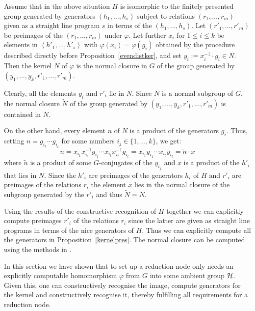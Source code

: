 \begin{Prop}
\label{kernelpres}
Assume that in the above situation $H$ is isomorphic to the
finitely presented group generated by generators $(h_1, \ldots, h_s)$
subject to relations $(r_1, \ldots, r_m)$ given as a straight line
program $s$ in terms of the $(h_1, \ldots, h_s)$. Let $(r'_1, \ldots,
r'_m)$ be preimages of the $(r_1, \ldots, r_m)$ under $\varphi$. 
Let further $x_i$ for $1 \le i \le k$ be elements in $\left< h'_1, \ldots, 
h'_s \right>$ with $\varphi(x_i) = \varphi(g_i)$ obtained by the procedure 
described directly before Proposition~\ref{evendistker}, and set 
$y_i := x_i^{-1} \cdot g_i \in N$. Then the kernel $N$ of
$\varphi$ is the normal closure in $G$ of the group generated by
$(y_1, \ldots, y_k, r'_1, \ldots, r'_m)$.
\end{Prop}
\proofbeg
Clearly, all the elements $y_i$ and $r'_i$ lie in $N$. Since $N$ is a
normal subgroup of $G$, the normal closure $\tilde N$ of the group generated
by $(y_1, \ldots, y_k, r'_1, \ldots, r'_m)$ is contained in $N$.

On the other hand, every element $n$ of $N$ is a product of the generators
$g_i$. Thus, setting $n = g_{i_1} \cdots g_{i_t}$ for some numbers
$i_j \in \{ 1, \ldots, k \}$, we get:
\[ n = x_{i_1} x_{i_1}^{-1} g_{i_1} \cdots x_{i_t} x_{i_t}^{-1} g_{i_t}
     = x_{i_1} y_{i_1} \cdots x_{i_t} y_{i_t}
     = \tilde n \cdot x \]
where $\tilde n$ is a product of some $G$-conjugates of the $y_{i_j}$
and $x$ is a product of the $h'_i$ that lies in $N$. Since the $h'_i$
are preimages of the generators $h_i$ of $H$ and $r'_i$ are preimages
of the relations $r_i$ the element $x$ lies in the normal closure
of the subgroup generated by the $r'_i$ and thus $\tilde N = N$.
\proofend

\begin{Rem}
Using the results of the constructive recognition of $H$ together we
can explicitly compute preimages $r'_i$ of the relations $r_i$ since
the latter are given as straight line programs in terms of the nice
generators of $H$. Thus we can explicitly compute all the generators in
Proposition~\ref{kernelpres}. The normal closure can be computed using
the methods in \cite[Chapter 2]{Ser}.
\end{Rem}

In this section we have shown that to set up a reduction node only needs
an explicitly computable homomorphism $\varphi$ from $G$ into some
ambient group $\mathcal{H}$. Given this, one can constructively recognise the
image, compute generators for the kernel and constructively recognise it,
thereby fulfilling all requirements for a reduction node.


